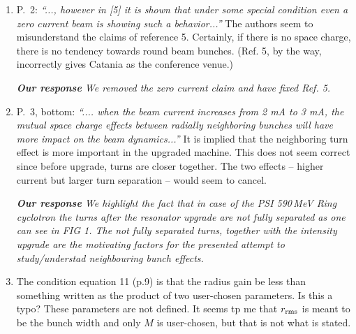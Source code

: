 \documentclass[10pt]{report}
\begin{document}
 \begin{enumerate}
  \item P.\ 2: \textit{``..., however in [5] it is shown that
 under some special condition even a zero current beam is showing such a
 behavior...''} The authors seem to misunderstand the claims of reference 5.
 Certainly, if there is no space charge, there is no tendency towards round beam
 bunches. (Ref. 5, by the way, incorrectly gives Catania as the conference
 venue.)
 
 \vspace{+2mm}
 {\it {\bf Our response}  We removed the zero current claim and have fixed Ref. 5.}
 \vspace{+2mm}

 
  \item P.\ 3, bottom: \textit{``.... when the
 beam current increases from 2 mA to 3 mA, the mutual space charge effects
 between radially neighboring bunches will have more impact on the beam
 dynamics...''} It is implied that the neighboring turn effect is more important
 in the upgraded machine. This does not seem correct since before upgrade, turns
 are closer together. The two effects -- higher current but larger turn
 separation -- would seem to cancel.
 
 
 \vspace{+2mm}
 {\it {\bf Our response}  We highlight the fact that in case of the PSI 590\,MeV Ring cyclotron
 the turns {\em after the resonator upgrade} are not fully separated as one can see in FIG 1. The not fully separated turns, together with the
 intensity upgrade are the motivating factors for the presented attempt to study/understad neighbouring bunch effects. }
 \vspace{+2mm}
 
  
\vspace{+2mm} 

  \item The condition equation 11 (p.9) is that the radius gain be less than
 something 
 written as the 
 product of two user-chosen parameters. Is this a typo? These parameters are not
 defined. It seems tp me that $r_{\rm rms}$ is meant to be the bunch width and
 only $M$ is user-chosen, but that is not what is stated.
 

\end{enumerate}
\end{document}
